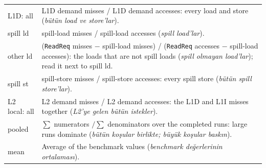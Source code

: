 \documentclass[10pt,a4paper]{article}
\newcommand{\ct}[1]{\texttt{#1}}
\renewcommand{\arraystretch}{1.2}
\begin{document}
{\footnotesize\renewcommand{\arraystretch}{1.0}
\begin{tabularx}{\textwidth}{@{}>{\raggedright\arraybackslash}p{27mm} >{\raggedright\arraybackslash}X@{}}
L1D: all & L1D demand misses / L1D demand accesses: every load and store (\textit{b\"ut\"un load ve store'lar}). \\
spill ld & spill-load misses / spill-load accesses (\textit{spill load'lar}). \\
other ld & (\ct{ReadReq} misses $-$ spill-load misses) / (\ct{ReadReq} accesses $-$ spill-load accesses): the loads that are not spill loads (\textit{spill olmayan load'lar}); read it next to spill ld. \\
spill st & spill-store misses / spill-store accesses: every spill store (\textit{b\"ut\"un spill store'lar}). \\
L2 local: all & L2 demand misses / L2 demand accesses: the L1D and L1I misses together (\textit{L2'ye gelen b\"ut\"un istekler}). \\
pooled & $\sum$ numerators $/ \sum$ denominators over the completed runs: large runs dominate (\textit{b\"ut\"un ko\c{s}ular birlikte; b\"uy\"uk ko\c{s}ular bask{\i}n}). \\
mean & Average of the benchmark values (\textit{benchmark de\u{g}erlerinin ortalamas{\i}}). \\
\end{tabularx}\par}
\end{document}
